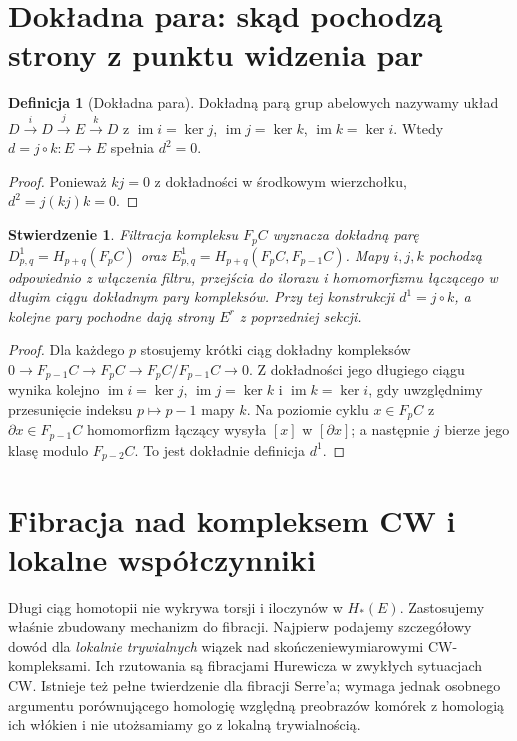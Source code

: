 \documentclass[11pt,a4paper,oneside]{report}
\theoremstyle{plain}
\newtheorem{stwierdzenie}[twierdzenie]{Stwierdzenie}
\theoremstyle{definition}
\newtheorem{definicja}[twierdzenie]{Definicja}
\theoremstyle{remark}
\begin{document}
\section{Dokładna para: skąd pochodzą strony z punktu widzenia par}
\begin{definicja}[Dokładna para]
Dokładną parą grup abelowych nazywamy układ
$D\xrightarrow{i}D\xrightarrow{j}E\xrightarrow{k}D$
z $\operatorname{im}i=\ker j$,
$\operatorname{im}j=\ker k$,
$\operatorname{im}k=\ker i$.
Wtedy $d=j\circ k:E\to E$ spełnia $d^2=0$.
\end{definicja}
\begin{proof}
Ponieważ $kj=0$ z dokładności w środkowym wierzchołku,
$d^2=j(kj)k=0$.
\end{proof}
\begin{stwierdzenie}
Filtracja kompleksu $F_pC$ wyznacza dokładną parę
$D^1_{p,q}=H_{p+q}(F_pC)$ oraz
$E^1_{p,q}=H_{p+q}(F_pC,F_{p-1}C)$.
Mapy $i,j,k$ pochodzą odpowiednio z włączenia filtru,
przejścia do ilorazu i homomorfizmu łączącego
w długim ciągu dokładnym pary kompleksów.
Przy tej konstrukcji $d^1=j\circ k$, a kolejne pary
pochodne dają strony $E^r$ z poprzedniej sekcji.
\end{stwierdzenie}
\begin{proof}
Dla każdego $p$ stosujemy krótki ciąg dokładny kompleksów
$0\to F_{p-1}C\to F_pC\to F_pC/F_{p-1}C\to0$.
Z dokładności jego długiego ciągu wynika kolejno
$\operatorname{im}i=\ker j$, $\operatorname{im}j=\ker k$
i $\operatorname{im}k=\ker i$, gdy uwzględnimy przesunięcie
indeksu $p\mapsto p-1$ mapy $k$.
Na poziomie cyklu $x\in F_pC$ z $\partial x\in F_{p-1}C$
homomorfizm łączący wysyła $[x]$ w $[\partial x]$;
a następnie $j$ bierze jego klasę modulo $F_{p-2}C$.
To jest dokładnie definicja $d^1$.
\end{proof}

\section{Fibracja nad kompleksem CW i lokalne współczynniki}
Długi ciąg homotopii nie wykrywa torsji i iloczynów w $H_*(E)$.
Zastosujemy właśnie zbudowany mechanizm do fibracji.
Najpierw podajemy szczegółowy dowód dla \emph{lokalnie trywialnych}
wiązek nad skończeniewymiarowymi CW-kompleksami. Ich rzutowania
są fibracjami Hurewicza w zwykłych sytuacjach CW. Istnieje też
pełne twierdzenie dla fibracji Serre'a; wymaga jednak osobnego
argumentu porównującego homologię względną preobrazów komórek
z homologią ich włókien i nie utożsamiamy go z lokalną trywialnością.
\end{document}
